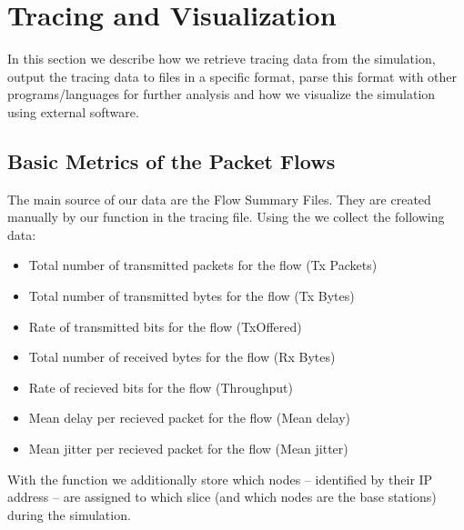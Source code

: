 

\chapter{Tracing and Visualization}
\label{chapter:tracing}
In this section we describe how we retrieve tracing data from the simulation, output the tracing data to files in a specific format, parse this format with other programs/languages for further analysis and how we visualize the simulation using external software.

\section{Basic Metrics of the Packet Flows}
The main source of our data are the Flow Summary Files. They are created manually by our function  in the tracing file.
Using the  we collect the following data:
\begin{itemize}
	\item Total number of transmitted packets for the flow (Tx Packets)
	\item Total number of transmitted bytes for the flow (Tx Bytes)
	\item Rate of transmitted bits for the flow (TxOffered)
	\item Total number of received bytes for the flow (Rx Bytes)
	\item Rate of recieved bits for the flow (Throughput)
	\item Mean delay per recieved packet for the flow (Mean delay)
	\item Mean jitter per recieved packet for the flow (Mean jitter)
\end{itemize}

With the function  we additionally store which nodes -- identified by their IP address -- are assigned to which slice (and which nodes are the base stations) during the simulation.


